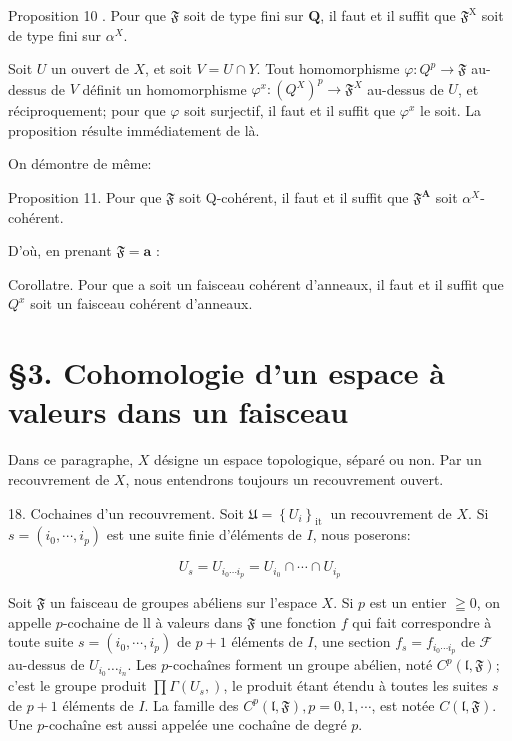 Proposition 10 . Pour que $\mathfrak{F}$ soit de type fini sur $\boldsymbol{Q}$, il faut et il suffit que $\mathfrak{F}^{\mathrm{X}}$ soit de type fini sur $\alpha^{X}$.

Soit $U$ un ouvert de $X$, et soit $V=U \cap Y$. Tout homomorphisme $\varphi: Q^{p} \rightarrow \mathfrak{F}$ au-dessus de $V$ définit un homomorphisme $\varphi^{x}:\left(Q^{X}\right)^{p} \rightarrow \mathfrak{F}^{X}$ au-dessus de $U$, et réciproquement; pour que $\varphi$ soit surjectif, il faut et il suffit que $\varphi^{x}$ le soit. La proposition résulte immédiatement de là.

On démontre de même:

Proposition 11. Pour que $\mathfrak{F}$ soit Q-cohérent, il faut et il suffit que $\mathfrak{F}^{\mathbf{A}}$ soit $\alpha^{X}$-cohérent.

D'où, en prenant $\mathfrak{F}=\boldsymbol{a}$ :

Corollatre. Pour que a soit un faisceau cohérent d'anneaux, il faut et il suffit que $Q^{x}$ soit un faisceau cohérent d'anneaux.

\section{§3. Cohomologie d'un espace à valeurs dans un faisceau}

Dans ce paragraphe, $X$ désigne un espace topologique, séparé ou non. Par un recouvrement de $X$, nous entendrons toujours un recouvrement ouvert.

18. Cochaines d'un recouvrement. Soit $\mathfrak{U}=\left\{U_{i}\right\}_{\text {it }}$ un recouvrement de $X$. Si $s=\left(i_{0}, \cdots, i_{p}\right)$ est une suite finie d'éléments de $I$, nous poserons:

$$
U_{s}=U_{i_{0} \cdots i_{p}}=U_{i_{0}} \cap \cdots \cap U_{i_{p}}
$$

Soit $\mathfrak{F}$ un faisceau de groupes abéliens sur l'espace $X .$ Si $p$ est un entier $\geqq 0$, on appelle $p$-cochaine de ll à valeurs dans $\mathfrak{F}$ une fonction $f$ qui fait correspondre à toute suite $s=\left(i_{0}, \cdots, i_{p}\right)$ de $p+1$ éléments de $I$, une section $f_{s}=f_{i_{0} \cdots i_{p}}$ de $\mathscr{F}$ au-dessus de $U_{i_{0}} \ldots_{i_{n}} .$ Les $p$-cochaînes forment un groupe abélien, noté $C^{p}(\mathfrak{l}, \mathfrak{F}) ;$ c'est le groupe produit $\prod \Gamma\left(U_{s}, \mathfrak{}\right)$, le produit étant étendu à toutes les suites $s$ de $p+1$ éléments de $I$. La famille des $C^{p}(\mathfrak{l}, \mathfrak{F}), p=0,1, \cdots$, est notée $C(\mathfrak{l}, \mathfrak{F})$. Une $p$-cochaîne est aussi appelée une cochaîne de degré $p$.

